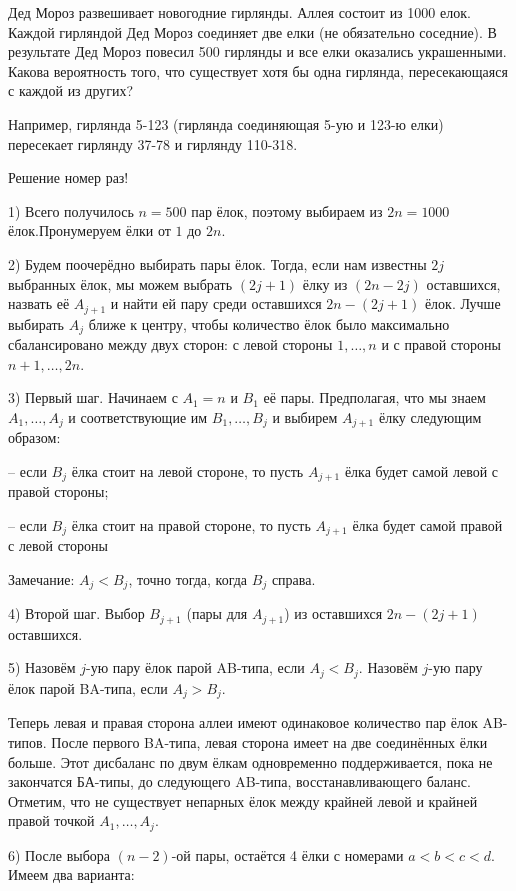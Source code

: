 \documentclass[nobib]{tufte-handout}
\theoremstyle{definition}
\newcounter{problem}
\newenvironment{problem}%
{%
\refstepcounter{problem}%
     \hypertarget{problem:{\theproblem}}{}
     \Writetofile{solution_file}{\protect\hypertarget{soln:\theproblem}{}}
     \begin{myenum}[label=\bfseries\protect\hyperlink{soln:\theproblem}{\theproblem},ref=\theproblem]
     \item%
    }%
    {%
    \end{myenum}}
\begin{document}
\begin{problem}
Дед Мороз развешивает новогодние гирлянды. Аллея состоит из 1000 елок. Каждой гирляндой Дед Мороз соединяет две елки (не обязательно соседние). В результате Дед Мороз повесил 500 гирлянды и все елки оказались украшенными. Какова вероятность того, что существует хотя бы одна гирлянда, пересекающаяся с каждой из других?

Например, гирлянда 5-123 (гирлянда соединяющая 5-ую и 123-ю елки) пересекает гирлянду 37-78 и гирлянду 110-318.

\begin{sol}
Решение номер раз!

1) Всего получилось $n=500$ пар ёлок, поэтому выбираем из $2n=1000$ ёлок.Пронумеруем ёлки от $1$ до $2n$.

2) Будем поочерёдно выбирать пары ёлок. Тогда, если нам известны $2j$ выбранных ёлок, мы можем выбрать $(2j+1)$ ёлку из $(2n-2j)$ оставшихся, назвать её $A_{j+1}$ и найти ей пару среди оставшихся $2n-(2j+1)$ ёлок. Лучше выбирать $A_j$ ближе к центру, чтобы количество ёлок было максимально сбалансировано между двух сторон: с левой стороны ${1,\ldots ,n}$ и с правой стороны ${n+1,\ldots ,2n}$.

3) Первый шаг. Начинаем с $A_1=n$ и $B_1$ её пары. Предполагая, что мы знаем $A_1,\ldots ,A_j$  и соответствующие им $B_1,\ldots , B_j$ и выбирем $A_{j+1}$ ёлку следующим образом:

– если $B_j$ ёлка стоит на левой стороне, то пусть $A_{j+1}$ ёлка будет самой левой с правой стороны;

– если $B_j$ ёлка стоит на правой стороне, то пусть $A_{j+1}$ ёлка будет самой правой с левой стороны

Замечание: $A_j<B_j$, точно тогда, когда $B_j$ справа.

4) Второй шаг. Выбор $B_{j+1}$ (пары для $A_{j+1}$) из оставшихся $2n-(2j+1)$ оставшихся.

5) Назовём $j$-ую пару ёлок парой AB-типа, если $A_j<B_j$.
Назовём $j$-ую пару ёлок парой BA-типа, если $A_j>B_j$.

Теперь левая и правая сторона аллеи имеют одинаковое количество пар ёлок AB-типов. После первого BA-типа, левая сторона имеет на две соединённых ёлки больше. Этот дисбаланс по двум ёлкам одновременно поддерживается, пока не закончатся БА-типы, до следующего AB-типа, восстанавливающего баланс. Отметим, что не существует непарных ёлок между крайней левой и крайней правой точкой $A_1,\ldots ,A_j$.

6) После выбора $(n-2)$-ой пары, остаётся 4 ёлки с номерами $a < b < c < d$. Имеем два варианта:


\end{sol}
\end{problem}
\end{document}
